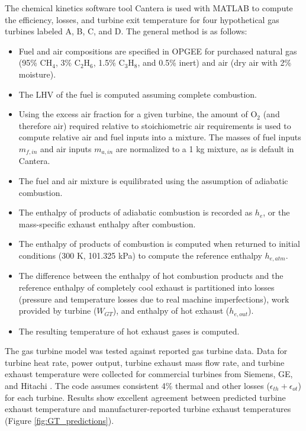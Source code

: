 \documentclass[11pt]{report}
\begin{document}
The chemical kinetics software tool Cantera \cite{Cantera2012} is used with MATLAB to compute the efficiency, losses, and turbine exit temperature for four hypothetical gas turbines labeled A, B, C, and D. The general method is as follows:
\begin{itemize}
\item Fuel and air compositions are specified in OPGEE for purchased natural gas (95\% CH$_4$, 3\% C$_2$H$_6$, 1.5\% C$_3$H$_8$, and 0.5\% inert) and air (dry air with 2\% moisture). 
\item The LHV of the fuel is computed assuming complete combustion.
\item Using the excess air fraction for a given turbine, the amount of O$_2$ (and therefore air) required relative to stoichiometric air requirements is used to compute relative air and fuel inputs into a mixture. The masses of fuel inputs $m_{f,in}$ and air inputs $m_{a,in}$ are normalized to a 1 kg mixture, as is default in Cantera.
\item The fuel and air mixture is equilibrated using the assumption of adiabatic combustion.
\item The enthalpy of products of adiabatic combustion is recorded as $h_{e}$, or the mass-specific exhaust enthalpy after combustion.
\item The enthalpy of products of combustion is computed when returned to initial conditions (300 K, 101.325 kPa) to compute the reference enthalpy $h_{e,atm}$.
\item The difference between the enthalpy of hot combustion products and the reference enthalpy of completely cool exhaust is partitioned into losses (pressure and temperature losses due to real machine imperfections), work provided by turbine ($W_{GT}$), and enthalpy of hot exhaust ($h_{e,out}$).
\item The resulting temperature of hot exhaust gases is computed.
\end{itemize}

The gas turbine model was tested against reported gas turbine data. Data for turbine heat rate, power output, turbine exhaust mass flow rate, and turbine exhaust temperature were collected for commercial turbines from Siemens, GE, and Hitachi \cite{Siemens2012, Badeer2012, Farmer2010}. The code assumes consistent 4\% thermal and other losses ($\epsilon_{th} + \epsilon_{ot}$) for each turbine. Results show excellent agreement between predicted turbine exhaust temperature and manufacturer-reported turbine exhaust temperatures (Figure \ref{fig:GT_predictions}).
\end{document}

